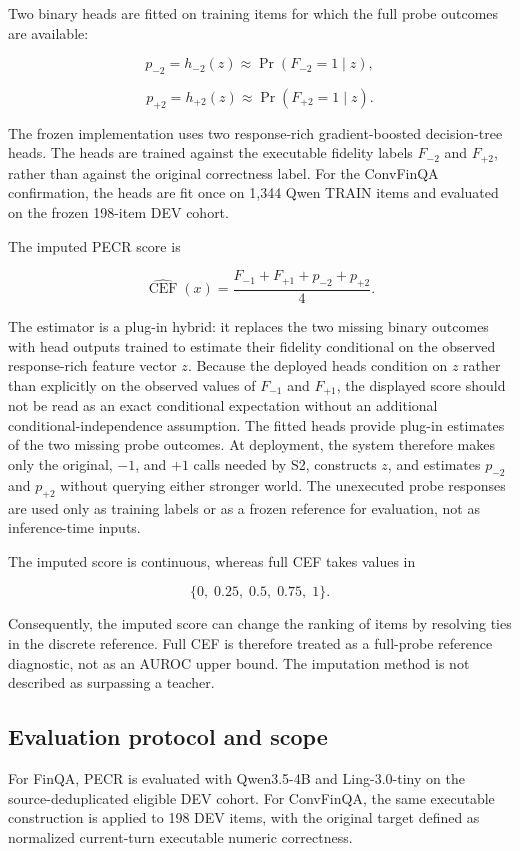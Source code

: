 \documentclass[11pt]{article}
\begin{document}
Two binary heads are fitted on training items for which the full probe outcomes are available:

\[
p_{-2}
=
h_{-2}(z)
\approx
\Pr(F_{-2}=1\mid z),
\]

\[
p_{+2}
=
h_{+2}(z)
\approx
\Pr(F_{+2}=1\mid z).
\]

The frozen implementation uses two response-rich gradient-boosted decision-tree heads. The heads are trained against the executable fidelity labels \(F_{-2}\) and \(F_{+2}\), rather than against the original correctness label. For the ConvFinQA confirmation, the heads are fit once on 1,344 Qwen TRAIN items and evaluated on the frozen 198-item DEV cohort.

The imputed PECR score is

\[
\widehat{\operatorname{CEF}}(x)
=
\frac{
F_{-1}+F_{+1}+p_{-2}+p_{+2}
}{4}.
\]

The estimator is a plug-in hybrid: it replaces the two missing binary outcomes with head outputs trained to estimate their fidelity conditional on the observed response-rich feature vector $z$. Because the deployed heads condition on $z$ rather than explicitly on the observed values of $F_{-1}$ and $F_{+1}$, the displayed score should not be read as an exact conditional expectation without an additional conditional-independence assumption. The fitted heads provide plug-in estimates of the two missing probe outcomes. At deployment, the system therefore makes only the original, \(-1\), and \(+1\) calls needed by S2, constructs \(z\), and estimates \(p_{-2}\) and \(p_{+2}\) without querying either stronger world. The unexecuted probe responses are used only as training labels or as a frozen reference for evaluation, not as inference-time inputs.

The imputed score is continuous, whereas full CEF takes values in

\[
\{0,\;0.25,\;0.5,\;0.75,\;1\}.
\]

Consequently, the imputed score can change the ranking of items by resolving ties in the discrete reference. Full CEF is therefore treated as a full-probe reference diagnostic, not as an AUROC upper bound. The imputation method is not described as surpassing a teacher.

\subsection{Evaluation protocol and scope}

For FinQA, PECR is evaluated with Qwen3.5-4B and Ling-3.0-tiny on the source-deduplicated eligible DEV cohort. For ConvFinQA, the same executable construction is applied to 198 DEV items, with the original target defined as normalized current-turn executable numeric correctness.
\end{document}
